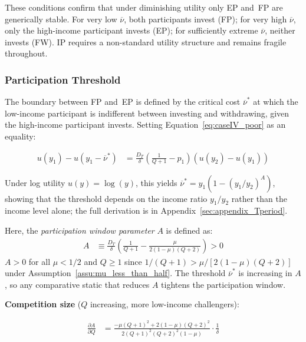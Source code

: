\documentclass[
    oneside,
    fontsize=10pt,leqno]{article}
\begin{document}
\medskip

These conditions confirm that under diminishing utility only EP
and~FP are generically stable. For very low $\overline{\nu}$, both
participants invest (FP); for very high $\overline{\nu}$, only
the high-income participant invests (EP); for sufficiently extreme $\overline{\nu}$,
neither invests (FW). IP requires a non-standard utility
structure and remains fragile throughout.

\subsubsection{\label{subsec:Threshold}Participation Threshold}

The boundary between FP and~EP is defined by the critical
cost $\overline{\nu}^{*}$ at which the low-income participant is indifferent
between investing and withdrawing, given the high-income participant invests.
Setting Equation~\ref{eq:caseIV_poor} as an equality:

\begin{align}
u(y_{1})-u(y_{1}-\overline{\nu}^{*}) & =\frac{D_{T}}{\delta}\left(\frac{1}{Q+1}-p_{1}\right)(u(y_{2})-u(y_{1}))\label{eq:threshold_general}
\end{align}

Under log utility $u(y)=\log(y)$, this yields
$\overline{\nu}^{*}=y_{1}(1-(y_{1}/y_{2})^{A})$, showing that the
threshold depends on the income ratio $y_{1}/y_{2}$ rather than the
income level alone; the full derivation is in
Appendix~\ref{sec:appendix_Tperiod}.

Here, the \emph{participation window parameter} $A$ is defined as:
\begin{align}
A & \equiv\frac{D_{T}}{\delta}\left(\frac{1}{Q+1}-\frac{\mu}{2(1-\mu)(Q+2)}\right)>0\label{eq:A_def}
\end{align}
$A>0$ for all $\mu<1/2$ and $Q\geq1$ since $1/(Q+1)>\mu/[2(1-\mu)(Q+2)]$
under Assumption~\ref{assu:mu_less_than_half}. The threshold
$\overline{\nu}^{*}$ is increasing in $A$, so any comparative static
that reduces $A$ tightens the participation window.


\medskip
\noindent\textbf{Competition size} ($Q$ increasing, more low-income challengers):

\begin{align}
\frac{\partial A}{\partial Q} & =\frac{-\mu(Q+1)^{2}+2(1-\mu)(Q+2)^{2}}{2(Q+1)^{2}(Q+2)^{2}(1-\mu)}\cdot\frac{1}{\delta}\label{eq:dA_dQ}
\end{align}
\end{document}

